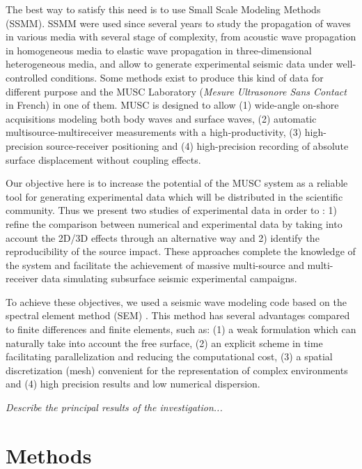 \documentclass[manuscript,revised]{geophysics}
\begin{document}
\noindent The best way to satisfy this need is to use Small Scale Modeling Methods (SSMM). SSMM were used since several years to study the propagation of waves in various media with several stage of complexity, from acoustic wave propagation in homogeneous media to elastic wave propagation in three-dimensional heterogeneous media, and allow to generate experimental seismic data under well-controlled conditions. Some methods exist to produce this kind of data for different purpose and the MUSC Laboratory (\textit{Mesure Ultrasonore Sans Contact} in French) in one of them. MUSC is designed to allow (1) wide-angle on-shore acquisitions modeling both body waves and surface waves, (2) automatic multisource-multireceiver measurements with a high-productivity, (3) high-precision source-receiver positioning and (4) high-precision recording of absolute surface displacement without coupling effects. 

\noindent Our objective here is to increase the potential of the MUSC system as a reliable tool for generating experimental data which will be distributed in the scientific community. 
\noindent Thus we present two studies of experimental data in order to : 1) refine the comparison between numerical and experimental data by taking into account the 2D/3D effects through an alternative way and 2) identify the reproducibility of the source impact. These approaches complete the knowledge of the system and facilitate the achievement of massive multi-source and multi-receiver data simulating subsurface seismic experimental campaigns.

\noindent To achieve these objectives, we used a seismic wave modeling code based on the spectral element method (SEM) \citep{Komatitsch_SEM_1998}. This method has several advantages compared to finite differences and finite elements, such as: (1) a weak formulation which can naturally take into account the free surface, (2) an explicit scheme in time facilitating parallelization and reducing the computational cost, (3) a spatial discretization (mesh) convenient for the representation of complex environments and (4) high precision results and low numerical dispersion.


\noindent \textit{Describe the principal results of the investigation...}


\section{Methods}
\end{document}
